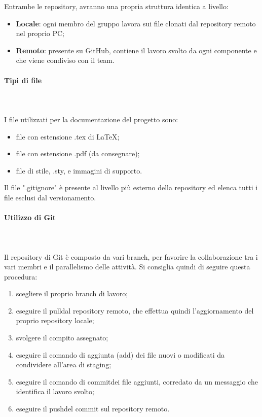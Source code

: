 Entrambe le repository, avranno una propria struttura identica a livello: \begin{itemize}
\item \textbf{Locale}: ogni membro del gruppo lavora sui file clonati dal repository remoto nel proprio PC;
\item \textbf{Remoto}: presente su GitHub, contiene il lavoro svolto da ogni componente e che viene condiviso con il team.
\end{itemize}

\paragraph{Tipi di file} \mbox{} \\ \mbox{} \\
I file utilizzati per la documentazione del progetto sono: \begin{itemize}
\item file con estensione .tex di \LaTeX{};
\item file con estensione .pdf (da consegnare);
\item file di stile, .sty,  e immagini di supporto.
\end{itemize}
Il file ".gitignore" è presente al livello più esterno della repository ed elenca tutti i file esclusi dal versionamento.

\paragraph{Utilizzo di Git} \mbox{} \\ \mbox{} \\
Il repository di Git è composto da vari branch\glo, per favorire la collaborazione tra i vari membri e il parallelismo delle attività. Si consiglia quindi di seguire questa procedura:
\begin{enumerate}
\item scegliere il proprio branch di lavoro;
\item eseguire il pull\glo dal repository remoto, che effettua quindi l'aggiornamento del proprio repository locale;
\item svolgere il compito assegnato;
\item eseguire il comando di aggiunta (add) dei file nuovi o modificati da condividere all'area di staging\glo;
\item eseguire il comando di commit\glo dei file aggiunti, corredato da un messaggio che identifica il lavoro svolto;
\item eseguire il push\glo del commit sul repository remoto.
\end{enumerate}
\pagebreak

